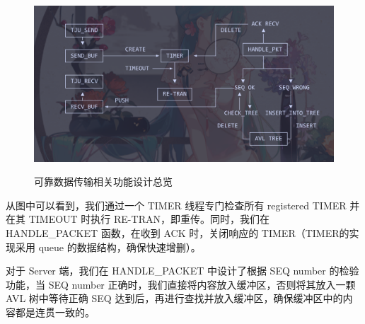 \begin{figure}[!htbp]
  \centering
  \includegraphics[width=.8\textwidth]{figures/Flow_10_4.png}
  \label{fig:flow}\caption{可靠数据传输相关功能设计总览}
\end{figure}

从图中可以看到，我们通过一个 TIMER 线程专门检查所有 registered TIMER 并在其 TIMEOUT 时执行 RE-TRAN，即重传。同时，我们在 HANDLE\_PACKET 函数，在收到 ACK 时，关闭响应的 TIMER（TIMER的实现采用 queue 的数据结构，确保快速增删）。

对于 Server 端，我们在 HANDLE\_PACKET 中设计了根据 SEQ number 的检验功能，当 SEQ number 正确时，我们直接将内容放入缓冲区，否则将其放入一颗 AVL 树中等待正确 SEQ 达到后，再进行查找并放入缓冲区，确保缓冲区中的内容都是连贯一致的。


